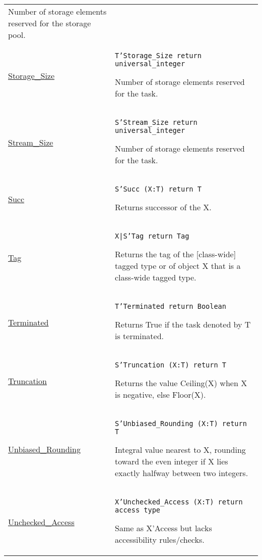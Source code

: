 \documentclass[english]{article}
\begin{document}
\begin{scriptsize}
\begin{multicols*}{3}
\begin{tabular}{@{}p{2cm}p{6.5cm}}
   Number of storage elements reserved for the storage pool.\\

   \href{http://www.ada-auth.org/standards/22rm/html/RM-K-2.html}{Storage\_Size} & \texttt{T'Storage\_Size return universal\_integer}

   Number of storage elements reserved for the task.\\

   \href{http://www.ada-auth.org/standards/22rm/html/RM-K-2.html}{Stream\_Size} & \texttt{S'Stream\_Size return universal\_integer}

   Number of storage elements reserved for the task.\\

   \href{http://www.ada-auth.org/standards/22rm/html/RM-K-2.html}{Succ} & \texttt{S'Succ (X:T) return T}

   Returns successor of the X.\\

   \href{http://www.ada-auth.org/standards/22rm/html/RM-K-2.html}{Tag} & \texttt{X|S'Tag return Tag}

   Returns the tag of the [class-wide] tagged type or of object X that is a class-wide tagged type.\\

   \href{http://www.ada-auth.org/standards/22rm/html/RM-K-2.html}{Terminated} & \texttt{T'Terminated return Boolean}

   Returns True if the task denoted by T is terminated.\\

   \href{http://www.ada-auth.org/standards/22rm/html/RM-K-2.html}{Truncation} & \texttt{S'Truncation (X:T) return T}

   Returns the value Ceiling(X) when X is negative, else Floor(X).\\


   \href{http://www.ada-auth.org/standards/22rm/html/RM-K-2.html}{Unbiased\_Rounding} & \texttt{S'Unbiased\_Rounding (X:T) return T}

   Integral value nearest to X, rounding toward the even integer if X lies exactly halfway between two integers.\\

   \href{http://www.ada-auth.org/standards/22rm/html/RM-K-2.html}{Unchecked\_Access} & \texttt{X'Unchecked\_Access (X:T) return access type}

   Same as X'Access but lacks accessibility rules/checks.\\


\end{tabular}
\end{multicols*}
\end{scriptsize}
\end{document}
